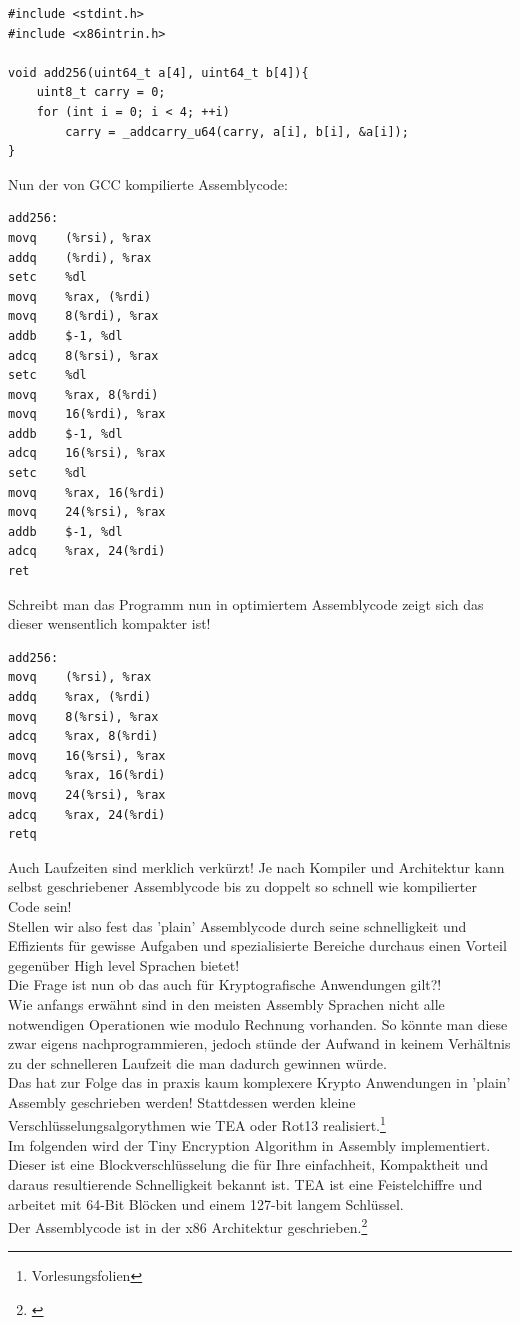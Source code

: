 \documentclass[a4paper,12pt]{scrartcl}
\begin{document}
\begin{lstlisting}
#include <stdint.h>
#include <x86intrin.h>

void add256(uint64_t a[4], uint64_t b[4]){
	uint8_t carry = 0;
	for (int i = 0; i < 4; ++i)
		carry = _addcarry_u64(carry, a[i], b[i], &a[i]);
}
\end{lstlisting}
\vspace{7 mm}
Nun der von GCC kompilierte Assemblycode:
\begin{lstlisting}
add256:
movq    (%rsi), %rax
addq    (%rdi), %rax
setc    %dl
movq    %rax, (%rdi)
movq    8(%rdi), %rax
addb    $-1, %dl
adcq    8(%rsi), %rax
setc    %dl
movq    %rax, 8(%rdi)
movq    16(%rdi), %rax
addb    $-1, %dl
adcq    16(%rsi), %rax
setc    %dl
movq    %rax, 16(%rdi)
movq    24(%rsi), %rax
addb    $-1, %dl
adcq    %rax, 24(%rdi)
ret
\end{lstlisting}
\newpage
Schreibt man das Programm nun in optimiertem Assemblycode zeigt sich das dieser wensentlich kompakter ist! \\


\begin{lstlisting}
add256:
movq    (%rsi), %rax
addq    %rax, (%rdi)
movq    8(%rsi), %rax
adcq    %rax, 8(%rdi)
movq    16(%rsi), %rax
adcq    %rax, 16(%rdi)
movq    24(%rsi), %rax
adcq    %rax, 24(%rdi)
retq
\end{lstlisting}
Auch Laufzeiten sind merklich verkürzt!
Je nach Kompiler und Architektur kann selbst geschriebener Assemblycode bis zu doppelt so schnell wie kompilierter Code sein!
\\
Stellen wir also fest das 'plain' Assemblycode durch seine schnelligkeit und Effizients für gewisse Aufgaben und spezialisierte Bereiche durchaus einen Vorteil gegenüber High level Sprachen bietet!\\
Die Frage ist nun ob das auch für Kryptografische Anwendungen gilt?!\\
Wie anfangs erwähnt sind in den meisten Assembly Sprachen nicht alle notwendigen Operationen wie modulo Rechnung vorhanden. So könnte man diese zwar eigens nachprogrammieren, jedoch stünde der Aufwand in keinem Verhältnis zu der schnelleren Laufzeit die man dadurch gewinnen würde.\\
Das hat zur Folge das in praxis kaum komplexere Krypto Anwendungen in 'plain' Assembly geschrieben werden! Stattdessen werden kleine Verschlüsselungsalgorythmen wie TEA oder Rot13 realisiert.\footnote{Vorlesungsfolien}\\
Im folgenden wird der Tiny Encryption Algorithm in Assembly implementiert. Dieser ist eine Blockverschlüsselung die für Ihre einfachheit, Kompaktheit und daraus resultierende Schnelligkeit bekannt ist. 
TEA ist eine Feistelchiffre und arbeitet mit 64-Bit Blöcken und einem 127-bit langem Schlüssel.\\
Der Assemblycode ist in der x86 Architektur geschrieben.\footnote{\cite{738514}}
\end{document}
